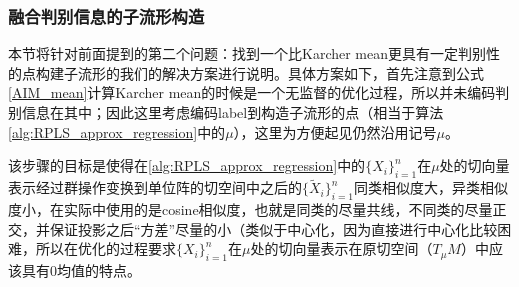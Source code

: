 \subsubsection{融合判别信息的子流形构造}
\label{sec:discrim_single_support}
本节将针对前面提到的第二个问题：找到一个比Karcher mean更具有一定判别性的点构建子流形的我们的解决方案进行说明。具体方案如下，首先注意到公式\ref{AIM_mean}计算Karcher mean的时候是一个无监督的优化过程，所以并未编码判别信息在其中；因此这里考虑编码label到构造子流形的点（相当于算法\ref{alg:RPLS_approx_regression}中的$\mu$），这里为方便起见仍然沿用记号$\mu$。

该步骤的目标是使得在\ref{alg:RPLS_approx_regression}中的$\{X_i\}_{i=1}^{n}$在$\mu$处的切向量表示经过群操作变换到单位阵的切空间中之后的$\{\tilde{X}_i\}_{i=1}^{n}$同类相似度大，异类相似度小，在实际中使用的是cosine相似度，也就是同类的尽量共线，不同类的尽量正交，并保证投影之后“方差”尽量的小（类似于中心化，因为直接进行中心化比较困难，所以在优化的过程要求$\{X_i\}_{i=1}^{n}$在$\mu$处的切向量表示在原切空间（$T_{\mu}M$）中应该具有0均值的特点。

